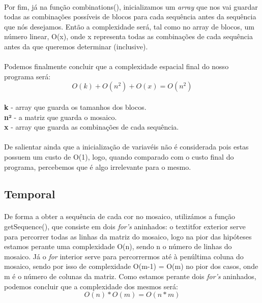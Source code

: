 \documentclass[12pt]{article}
\begin{document}
\paragraph{}
Por fim, já na função combinations(), inicializamos um \textit{array} que nos vai guardar todas as combinações possíveis de blocos para cada sequência antes da sequência que nós desejamos. Então a complexidade será, tal como no {array} de blocos, um número linear, O(x), onde x representa todas as combinações de cada sequência antes da que queremos determinar (inclusive).
\paragraph{}
Podemos finalmente concluir que a complexidade espacial final do nosso programa será:
\begin{equation}
O(k)+O(n^{2})+O(x) = O(n^{2})
\end{equation}
\\ \textbf{k} - array que guarda os tamanhos dos blocos.
\\ \textbf{n²} - a matriz que guarda o mosaico.
\\ \textbf{x} - array que guarda as combinações de cada sequência.
\paragraph{}
De salientar ainda que a inicialização de variavéis não é considerada pois estas possuem um custo de O(1), logo, quando comparado com o custo final do programa, percebemos que é algo irrelevante para o mesmo.

\subsection{Temporal}
\paragraph{}
De forma a obter a sequência de cada cor no mosaico, utilizámos a função getSequence(), que consiste em dois \textit{for's} aninhados: o textit{for} exterior serve para percorrer todas as linhas da matriz do mosaico, logo na pior das hipóteses estamos perante uma complexidade O(n), sendo n o número de linhas do mosaico. Já o \textit{for} interior serve para percorrermos até à penúltima coluna do mosaico, sendo por isso de complexidade O(m-1) = O(m) no pior dos casos, onde m é o número de colunas da matriz. Como estamos perante dois \textit{for's} aninhados, podemos concluir que a complexidade dos mesmos será:
\begin{equation}
O(n) * O(m) = O(n*m)
\end{equation}
\end{document}
